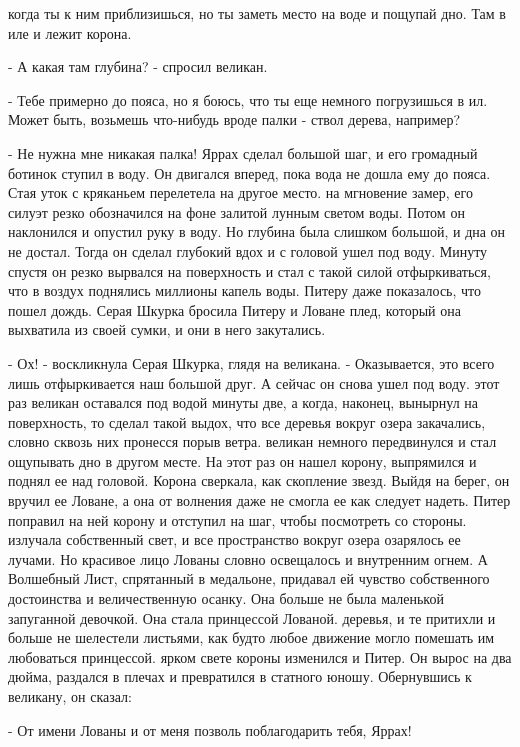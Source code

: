 когда ты к ним приблизишься, но ты заметь место на воде и пощупай дно. 
Там в иле и лежит корона.
\par- А какая там глубина? - спросил великан.
\par- Тебе примерно до пояса, но я боюсь, что ты еще немного 
погрузишься в ил. Может быть, возьмешь что-нибудь вроде палки - ствол 
дерева, например?
\par- Не нужна мне никакая палка!
 Яррах сделал большой шаг, и его громадный ботинок ступил в 
воду. Он двигался вперед, пока вода не дошла ему до пояса. Стая уток с 
кряканьем перелетела на другое место.
 на мгновение замер, его силуэт резко обозначился на фоне 
залитой лунным светом воды. Потом он наклонился и опустил руку в воду. 
Но глубина была слишком большой, и дна он не достал. Тогда он сделал 
глубокий вдох и с головой ушел под воду. Минуту спустя он резко 
вырвался на поверхность и стал с такой силой отфыркиваться, что в 
воздух поднялись миллионы капель воды.
 Питеру даже показалось, что пошел дождь. Серая Шкурка 
бросила Питеру и Ловане плед, который она выхватила из своей сумки, и 
они в него закутались.
\par- Ох! - воскликнула Серая Шкурка, глядя на великана. - 
Оказывается, это всего лишь отфыркивается наш большой друг. А сейчас 
он снова ушел под воду.
 этот раз великан оставался под водой минуты две, а когда, 
наконец, вынырнул на поверхность, то сделал такой выдох, что все 
деревья вокруг озера закачались, словно сквозь них пронесся порыв 
ветра.
 великан немного передвинулся и стал ощупывать дно в другом 
месте. На этот раз он нашел корону, выпрямился и поднял ее над 
головой. Корона сверкала, как скопление звезд. Выйдя на берег, он 
вручил ее Ловане, а она от волнения даже не смогла ее как следует 
надеть. Питер поправил на ней корону и отступил на шаг, чтобы 
посмотреть со стороны.
 излучала собственный свет, и все пространство вокруг озера 
озарялось ее лучами. Но красивое лицо Лованы словно освещалось и 
внутренним огнем. А Волшебный Лист, спрятанный в медальоне, придавал 
ей чувство собственного достоинства и величественную осанку. Она 
больше не была маленькой запуганной девочкой. Она стала принцессой 
Лованой.
 деревья, и те притихли и больше не шелестели листьями, как 
будто любое движение могло помешать им любоваться принцессой.
 ярком свете короны изменился и Питер. Он вырос на два дюйма, 
раздался в плечах и превратился в статного юношу. Обернувшись к 
великану, он сказал:
\par- От имени Лованы и от меня позволь поблагодарить тебя, Яррах! 
